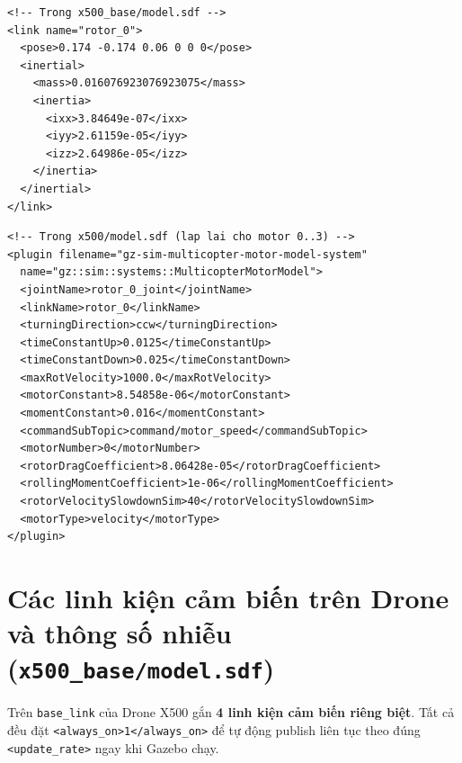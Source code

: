 \documentclass[11pt,a4paper]{article}
\begin{document}
\begin{minipage}[t]{0.52\textwidth}
\vspace{0pt}
\begin{lstlisting}[language=SDF, firstnumber=341]
<!-- Trong x500_base/model.sdf -->
<link name="rotor_0">
  <pose>0.174 -0.174 0.06 0 0 0</pose>
  <inertial>
    <mass>0.016076923076923075</mass>
    <inertia>
      <ixx>3.84649e-07</ixx>
      <iyy>2.61159e-05</iyy>
      <izz>2.64986e-05</izz>
    </inertia>
  </inertial>
</link>
\end{lstlisting}
\vspace{0.4em}
\begin{lstlisting}[language=SDF, firstnumber=7]
<!-- Trong x500/model.sdf (lap lai cho motor 0..3) -->
<plugin filename="gz-sim-multicopter-motor-model-system"
  name="gz::sim::systems::MulticopterMotorModel">
  <jointName>rotor_0_joint</jointName>
  <linkName>rotor_0</linkName>
  <turningDirection>ccw</turningDirection>
  <timeConstantUp>0.0125</timeConstantUp>
  <timeConstantDown>0.025</timeConstantDown>
  <maxRotVelocity>1000.0</maxRotVelocity>
  <motorConstant>8.54858e-06</motorConstant>
  <momentConstant>0.016</momentConstant>
  <commandSubTopic>command/motor_speed</commandSubTopic>
  <motorNumber>0</motorNumber>
  <rotorDragCoefficient>8.06428e-05</rotorDragCoefficient>
  <rollingMomentCoefficient>1e-06</rollingMomentCoefficient>
  <rotorVelocitySlowdownSim>40</rotorVelocitySlowdownSim>
  <motorType>velocity</motorType>
</plugin>
\end{lstlisting}
\end{minipage}

\newpage

\section{Các linh kiện cảm biến trên Drone và thông số nhiễu (\texttt{x500\_base/model.sdf})}

Trên \texttt{base\_link} của Drone X500 gắn \textbf{4 linh kiện cảm biến riêng biệt}. Tất cả đều đặt \texttt{<always\_on>1</always\_on>} để tự động publish liên tục theo đúng \texttt{<update\_rate>} ngay khi Gazebo chạy.

\end{document}
